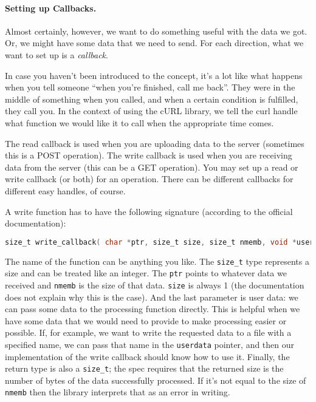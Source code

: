 \paragraph{Setting up Callbacks.} Almost certainly, however, we want to do something useful with the data we got. Or, we might have some data that we need to send. For each direction, what we want to set up is a \textit{callback}. 

In case you haven't been introduced to the concept, it's a lot like what happens when you tell someone ``when you're finished, call me back''. They were in the middle of something when you called, and when a certain condition is fulfilled, they call you. In the context of using the cURL library, we tell the curl handle what function we would like it to call when the appropriate time comes. 

The read callback is used when you are uploading data to the server (sometimes this is a POST operation). The write callback is used when you are receiving data from the server (this can be a GET operation). You may set up a read or write callback (or both) for an operation. There can be different callbacks for different easy handles, of course.
 
A write function has to have the following signature (according to the official documentation):
\begin{lstlisting}[language=C]
size_t write_callback( char *ptr, size_t size, size_t nmemb, void *userdata );
\end{lstlisting}

The name of the function can be anything you like. The \texttt{size\_t} type represents a size and can be treated like an integer. The \texttt{ptr} points to whatever data we received and \texttt{nmemb} is the size of that data. \texttt{size} is always 1 (the documentation does not explain why this is the case). And the last parameter is user data: we can pass some data to the processing function directly. This is helpful when we have some data that we would need to provide to make processing easier or possible. If, for example, we want to write the requested data to a file with a specified name, we can pass that name in the \texttt{userdata} pointer, and then our implementation of the write callback should know how to use it. Finally, the return type is also a \texttt{size\_t}; the spec requires that the returned size is the number of bytes of the data successfully processed. If it's not equal to the size of \texttt{nmemb} then the library interprets that as an error in writing. 


